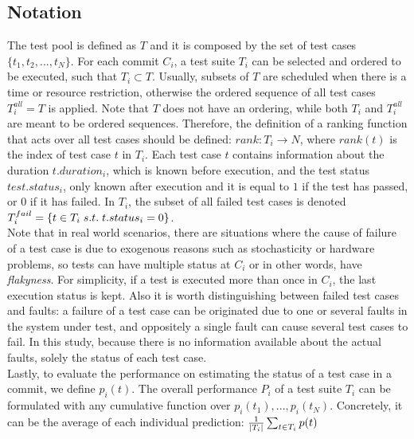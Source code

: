 \subsection{Notation}

The test pool is defined as $T$ and it is composed by the set of test cases $\{t_1, t_2, ..., t_N\}$. For each commit $C_i$, a  test suite $T_i$ can be selected and ordered to be executed, such that $T_i \subset T$. Usually, subsets of $T$ are scheduled when there is a time or resource restriction, otherwise the ordered sequence of all test cases $T_i^{all} = T$ is applied. Note that $T$ does not have an ordering, while both $T_i$ and $T_i^{all}$ are meant to be ordered sequences. Therefore, the definition of a ranking function that acts over all test cases should be defined: $ rank : T_i \to N$, where $rank(t)$ is the index of test case $t$ in $T_i$.
Each test case $t$ contains information about the duration $t.duration_i$, which is known before execution, and the test status $test.status_i$, only known after execution and it is equal to $1$ if the test has passed, or $0$ if it has failed. In $T_i$, the subset of all failed test cases is denoted $T_i^{fail} = \{ t \in T_i \hspace{0.1cm} s.t. \hspace{0.1cm} t.status_i = 0 \} $. 
\\

Note that in real world scenarios, there are situations where the cause of failure of a test case is due to exogenous reasons such as stochasticity or hardware problems, so tests  can have multiple status at $C_i$ or in other words, have \textit{flakyness}. For simplicity, if a test is executed more than once in $C_i$, the last execution status is kept. Also it is worth distinguishing between failed test cases and faults: a failure of a test case can be originated due to one or several faults in the system under test, and oppositely a single fault can cause several test cases to fail. In this study, because there is no information available about the actual faults, solely the status of each test case. 
\\

Lastly, to evaluate the performance on estimating the status of a test case in a commit, we define $p_i(t)$. The overall performance $P_i$ of a test suite $T_i$ can be formulated with any cumulative function over $p_i(t_1), ..., p_i(t_N)$. Concretely, it can be the average of each individual prediction: $\frac{1}{\lvert T_i\rvert}\sum_{t \in T_i}p(t)$

